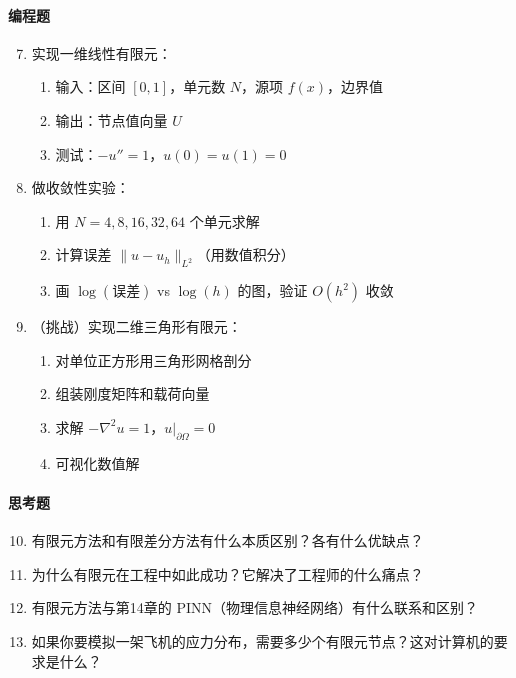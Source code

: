 \paragraph{编程题}
\begin{enumerate}
    \setcounter{enumi}{6}
    \item 实现一维线性有限元：
    \begin{enumerate}
        \item 输入：区间 $[0, 1]$，单元数 $N$，源项 $f(x)$，边界值
        \item 输出：节点值向量 $U$
        \item 测试：$-u'' = 1$，$u(0) = u(1) = 0$
    \end{enumerate}
    
    \item 做收敛性实验：
    \begin{enumerate}
        \item 用 $N = 4, 8, 16, 32, 64$ 个单元求解
        \item 计算误差 $\|u - u_h\|_{L^2}$（用数值积分）
        \item 画 $\log(\text{误差})$ vs $\log(h)$ 的图，验证 $O(h^2)$ 收敛
    \end{enumerate}
    
    \item （挑战）实现二维三角形有限元：
    \begin{enumerate}
        \item 对单位正方形用三角形网格剖分
        \item 组装刚度矩阵和载荷向量
        \item 求解 $-\nabla^2 u = 1$，$u|_{\partial\Omega} = 0$
        \item 可视化数值解
    \end{enumerate}
\end{enumerate}

\paragraph{思考题}
\begin{enumerate}
    \setcounter{enumi}{9}
    \item 有限元方法和有限差分方法有什么本质区别？各有什么优缺点？
    
    \item 为什么有限元在工程中如此成功？它解决了工程师的什么痛点？
    
    \item 有限元方法与第14章的 PINN（物理信息神经网络）有什么联系和区别？
    
    \item 如果你要模拟一架飞机的应力分布，需要多少个有限元节点？这对计算机的要求是什么？
\end{enumerate}



